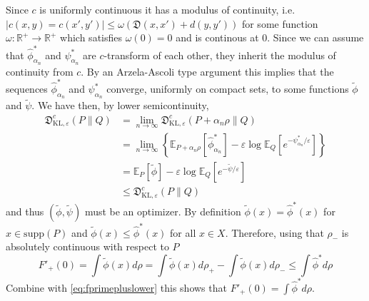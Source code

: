 \documentclass{amsart}
\newcommand{\LRB}[1]{\textcolor{blue}{LRB: #1}}
\theoremstyle{definition}
\theoremstyle{remark}
\numberwithin{equation}{section}
\begin{document}
Since $c$ is uniformly continuous it has a modulus of continuity, i.e. $|c(x,y)=c(x',y')|\le \omega(\mathfrak{D}(x,x')+ d(y,y'))$
for some function $\omega: \mathbb{R}^+\to \mathbb{R^+}$ which satisfies $\omega(0)=0$ and is continous at $0$. Since we can assume that $\widehat{\phi}^*_{\alpha_n}$ and $\psi^*_{\alpha_n}$ are $c$-transform of each other, they inherit the modulus of continuity from $c$. By an Arzela-Ascoli type argument this implies that the sequences $\widehat{\phi}^*_{\alpha_n}$ and 
$\psi^*_{\alpha_n}$ converge, uniformly on compact sets, to some functions $\widetilde{\phi}$ and $\widetilde{\psi}$.    
We have then, by lower semicontinuity,
\begin{equation}
\begin{aligned}
 \mathfrak{D}^{c}_{\textrm{KL},\varepsilon}(P \|Q) &= \lim_{n \to \infty}
 \mathfrak{D}^{c}_{\textrm{KL},\varepsilon}(P + \alpha_{n} \rho\|Q) \\
& =\lim_{n \to \infty} 
\left\{ \mathbb{E}_{P + \alpha_n\rho}[\widehat{\phi}^*_{\alpha_n}] - \varepsilon \log \mathbb{E}_Q[e^{-\psi^*_{\alpha_n}/\varepsilon}] \right\} \\
& =  \mathbb{E}_P[\widetilde{\phi}] - \varepsilon \log \mathbb{E}_Q[e^{-\widetilde{\psi}/\varepsilon}] \\
& \le  \mathfrak{D}^{c}_{\textrm{KL},\varepsilon}(P \|Q)
\end{aligned}
\end{equation}
and thus $(\widetilde{\phi}, \widetilde{\psi})$ must be an optimizer.  By definition  $\widetilde{\phi}(x)=\widehat{\phi}^*(x) $ for $x \in \textrm{supp}(P)$ and $\widetilde{\phi}(x)\le \widehat{\phi}^*(x)$ for all $x\in X$. 
Therefore, using that $\rho_-$ is absolutely continuous with respect to $P$ 
\begin{equation}
F'_+(0)= \int \widetilde{\phi}(x) d\rho = \int \widetilde{\phi}(x) d\rho_+ - \int \widetilde{\phi}(x) d\rho_- \le \int  \widehat{\phi}^* d\rho 
\end{equation}
Combine with \eqref{eq:fprimepluslower} this shows that $F'_+(0)=\int  \widehat{\phi}^* d\rho$.


\end{document}
